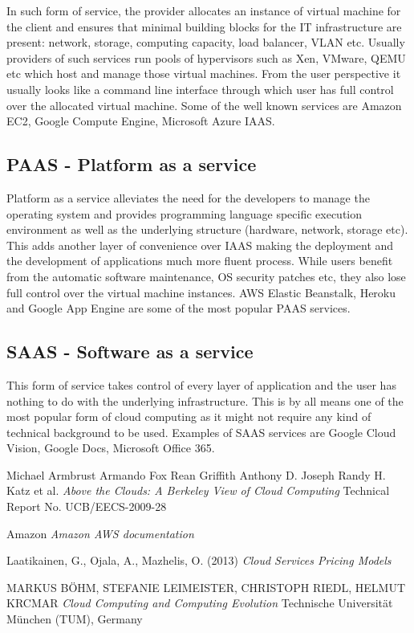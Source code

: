 \documentclass[licencjacka,en]{thesisclass}
\begin{document}
In such form of service, the provider allocates an instance of virtual machine for the client 
and ensures that minimal building blocks for the IT infrastructure are present:
network, storage, computing capacity, load balancer, VLAN etc.
Usually providers of such services run pools of hypervisors such as Xen, VMware, QEMU etc which host and manage
those virtual machines. From the user perspective it usually looks like a command line interface
through which user has full control over the allocated virtual machine. Some of the well known
services are Amazon EC2, Google Compute Engine, Microsoft Azure IAAS.

\subsection{PAAS - Platform as a service}

Platform as a service alleviates the need for the developers to manage the operating system and
provides programming language specific execution environment as well as the underlying structure
(hardware, network, storage etc). This adds another layer of convenience over IAAS making the deployment
and the development of applications much more fluent process. While users benefit from the automatic software maintenance,
OS security patches etc, they also lose full control over the virtual machine instances. AWS Elastic Beanstalk, Heroku
and Google App Engine are some of the most popular PAAS services.

\subsection{SAAS - Software as a service}

This form of service takes control of every layer of application and the user has nothing to do with
the underlying infrastructure. This is by all means one of the most popular form of cloud computing as
it might not require any kind of technical background to be used. Examples of SAAS services are Google
Cloud Vision, Google Docs, Microsoft Office 365. 

\begin{thebibliography}{99}

Michael Armbrust Armando Fox Rean Griffith Anthony D. Joseph Randy H. Katz et al.
\textit{Above the Clouds: A Berkeley View of Cloud Computing} 
Technical Report No. UCB/EECS-2009-28

Amazon
\textit{Amazon AWS documentation} 
    
Laatikainen, G., Ojala, A., Mazhelis, O. (2013)
\textit{Cloud Services Pricing Models}

MARKUS BÖHM, STEFANIE LEIMEISTER, CHRISTOPH RIEDL, HELMUT KRCMAR
\textit{Cloud Computing and Computing Evolution}
Technische Universität München (TUM), Germany

\end{thebibliography}
\end{document}
